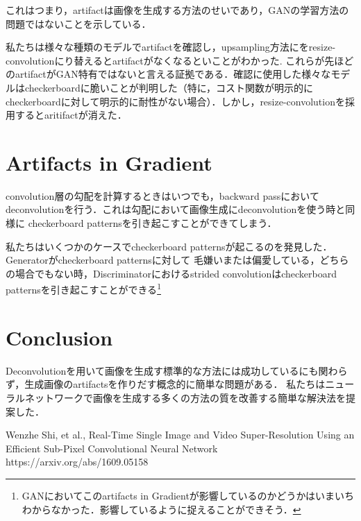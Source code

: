 \documentclass[uplatex, dvipdfmx]{jsarticle}
\theoremstyle{definition}
\begin{document}
    これはつまり，artifactは画像を生成する方法のせいであり，GANの学習方法の問題ではないことを示している．

    私たちは様々な種類のモデルでartifactを確認し，upsampling方法にをresize-convolutionにり替えるとartifactがなくなるといことがわかった.
    これらが先ほどのartifactがGAN特有ではないと言える証拠である．確認に使用した様々なモデルはcheckerboardに脆いことが判明した（特に，コスト関数が明示的に
    checkerboardに対して明示的に耐性がない場合）．しかし，resize-convolutionを採用するとaritifactが消えた．

    \section{Artifacts in Gradient}
    convolution層の勾配を計算するときはいつでも，backward passにおいてdeconvolutionを行う．これは勾配において画像生成にdeconvolutionを使う時と同様に
    checkerboard patternsを引き起こすことができてしまう．

    私たちはいくつかのケースでcheckerboard patternsが起こるのを発見した．Generatorがcheckerboard patternsに対して
    毛嫌いまたは偏愛している，どちらの場合でもない時，Discriminatorにおけるstrided convolutionはcheckerboard patternsを引き起こすことができる\footnote{GANにおいてこのartifacts in Gradientが影響しているのかどうかはいまいちわからなかった．影響しているように捉えることができそう．}

    \section{Conclusion}
    Deconvolutionを用いて画像を生成す標準的な方法には成功しているにも関わらず，生成画像のartifactsを作りだす概念的に簡単な問題がある．
    私たちはニューラルネットワークで画像を生成する多くの方法の質を改善する簡単な解決法を提案した．

    \newpage
    \begin{thebibliography}{10}
            Wenzhe Shi, et al., 
            Real-Time Single Image and Video Super-Resolution Using an Efficient Sub-Pixel Convolutional Neural Network \\
            https://arxiv.org/abs/1609.05158
    \end{thebibliography}
    
\end{document}
